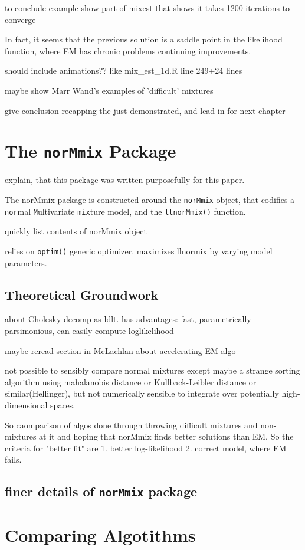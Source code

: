 to conclude example show part of mixest that shows it takes 1200 iterations to converge

In fact, it seems that the previous solution is a saddle point in the likelihood function, where EM has chronic problems continuing improvements.

should include animations?? like mix\_est\_1d.R line 249+24 lines

maybe show Marr Wand's examples of 'difficult' mixtures

give conclusion recapping the just demonstrated, and lead in for next chapter






\chapter{The {\tt norMmix} Package}

explain, that this package was written purposefully for this paper.

The norMmix package is constructed around the {\tt norMmix} object, that codifies a {\tt nor}mal {\tt M}ultivariate {\tt mix}ture model,  and the {\tt llnorMmix()} function.

quickly list contents of norMmix object

relies on {\tt optim()} generic optimizer. maximizes llnormix by varying model parameters.

\section{Theoretical Groundwork}

about Cholesky decomp as ldlt. has advantages: fast, parametrically parsimonious, can easily compute loglikelihood

maybe reread section in McLachlan about accelerating EM algo

not possible to sensibly compare normal mixtures except maybe a strange sorting algorithm using mahalanobis distance or Kullback-Leibler distance or similar(Hellinger), but not numerically sensible to integrate over potentially high-dimensional spaces.

So caomparison of algos done through throwing difficult mixtures and non-mixtures at it and hoping that norMmix finds better solutions than EM. So the criteria for "better fit" are 1. better log-likelihood 2. correct model, where EM fails.

\section{finer details of {\tt norMmix} package}




\chapter{Comparing Algotithms}
